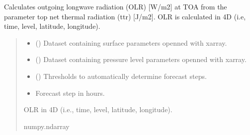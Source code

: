 \documentclass[a4paper,11pt,english]{sphinxmanual}
\begin{document}

\begin{fulllineitems}
\label{\detokenize{modules:climaccf.processing_surf_vars.get_olr_4d}}
\pysigstartsignatures
{}
\pysigstopsignatures
\sphinxAtStartPar
Calculates outgoing longwave radiation (OLR) {[}W/m2{]} at TOA from the parameter top net thermal radiation (ttr)
{[}J/m2{]}. OLR is calculated in 4D (i.e, time, level, latitude, longitude).
\begin{quote}\begin{description}
\begin{itemize}
\item {} 
\sphinxAtStartPar
{} () \textendash{} Dataset containing surface parameters openned with xarray.

\item {} 
\sphinxAtStartPar
{} () \textendash{} Dataset containing pressure level parameters openned with xarray.

\item {} 
\sphinxAtStartPar
{} () \textendash{} Thresholds to automatically determine forecast steps.

\item {} 
\sphinxAtStartPar
{} \textendash{} Forecast step in hours.

\end{itemize}

\sphinxAtStartPar
OLR in 4D (i.e., time, level, latitude, longitude).

\sphinxAtStartPar
numpy.ndarray

\end{description}\end{quote}

\end{fulllineitems}
\end{document}

